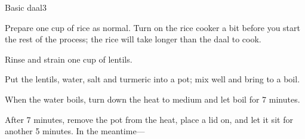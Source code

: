 \documentclass{article}
\begin{document}
  \begin{recipe}{Basic daal}{3}
    \begin{step}
      \begin{ingrs}
      \end{ingrs}
      \begin{stepdesc}
        Prepare one cup of rice as normal. Turn on the rice cooker a bit before you start the rest of the process; the rice will take longer than the daal to cook.
      \end{stepdesc}
    \end{step}
    \begin{step}
      \begin{ingrs}
      \end{ingrs}
      \begin{stepdesc}
        Rinse and strain one cup of lentils.
      \end{stepdesc}
    \end{step}
    \begin{step}
      \begin{ingrs}
      \end{ingrs}
      \begin{stepdesc}
        Put the lentils, water, salt and turmeric into a pot; mix well and bring to a boil.
      \end{stepdesc}
    \end{step}
    \begin{step}
      \begin{ingrs}
      \end{ingrs}
      \begin{stepdesc}
        When the water boils, turn down the heat to medium and let boil for 7 minutes.
      \end{stepdesc}
    \end{step}
    \begin{step}
      \begin{ingrs}
      \end{ingrs}
      \begin{stepdesc}
        After 7 minutes, remove the pot from the heat, place a lid on, and let it sit for another 5 minutes. In the meantime---

\end{stepdesc}
\end{step}
\end{recipe}
\end{document}
